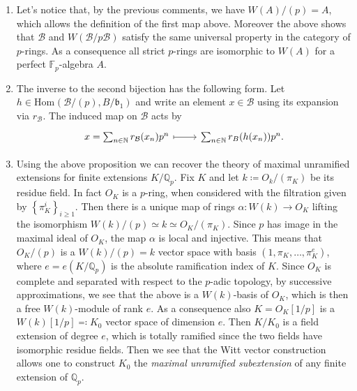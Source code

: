 \begin{rem}[]\leavevmode\vspace{-.2\baselineskip}
\begin{enumerate}
\item Let's notice that, by the previous comments, we have
	$W(A)/ (p) = A$, which allows the definition of the first map above.
	Moreover the above shows that $\mathcal{B}$ and $W(\mathcal{B}/p \mathcal{B})$
	satisfy the same universal property in the category of $p$-rings.
	As a consequence all strict $p$-rings are isomorphic to $W(A)$ for
	a perfect $\mathbb{F}_p$-algebra $A$.

\item The inverse to the second bijection has the following form.
	Let $h \in \mathrm{Hom}_{  } \left( \mathcal{B}/ (p), B/\mathfrak{b}_1 \right)$
	and write an element $x \in \mathcal{B}$ using its expansion via $r_{\mathcal{B}}$.
	The induced map on $\mathcal{B}$ acts by
	\begin{equation*}
	\begin{tikzcd}[row sep = 0ex
		,/tikz/column 1/.append style={anchor=base east}
		,/tikz/column 2/.append style={anchor=base west}]
		x = \sum_{n \in \mathbb{N} }^{  } r_{\mathcal{B}}(x_n) p^n 
		\arrow[r, "", mapsto] & 
		\sum_{n \in \mathbb{N} }^{  } r_B(h(x_n)) p^n
	.\end{tikzcd}
	\end{equation*} 

\item Using the above proposition we can recover the theory of maximal unramified
	extensions for finite extensions $K/\mathbb{Q}_p$.
	Fix $K$ and let $k \coloneqq O_k/ (\pi_K)$ be its residue field.
	In fact $O_K$ is a $p$-ring, when considered with the filtration
	given by $\left\{ \pi_K^i \right\}_{i \geq 1}$.
	Then there is a unique map of rings $\alpha\colon W(k) \to O_K$
	lifting the isomorphism $W(k)/ (p) \simeq k \simeq O_K/ (\pi_K)$.
	Since $p$ has image in the maximal ideal of $O_K$,
	the map $\alpha$ is local and injective.
	This means that $O_K/ (p)$ is a $W(k)/ (p) = k$ vector space
	with basis $\left(1, \pi_K, \ldots, \pi_K^e\right)$,
	where $e = e(K/\mathbb{Q}_p)$ is the absolute ramification
	index of $K$.
	Since $O_K$ is complete and separated with respect to the $p$-adic topology,
	by successive approximations, we see that the above is a
	$W(k)$-basis of $O_K$, which is then a free $W(k)$-module
	of rank $e$.
	As a consequence also $K = O_K[1/p]$ is a $W(k)[1/p] \eqqcolon K_0$
	vector space of dimension $e$.
	Then $K/K_0$ is a field extension of degree $e$, which is totally ramified
	since the two fields have isomorphic residue fields.
	Then we see that the Witt vector construction allows one to
	construct $K_0$ the {\em maximal unramified subextension} of any
	finite extension of $\mathbb{Q}_p$.


\end{enumerate}
\end{rem}
